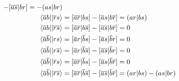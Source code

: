 \begin{align}
	-
	\chemtwo{\borb{a}\borb{s}}{\aorb{b}\aorb{r}}
=
	-\spacetwo{as}{br} \\
%
%
	\antitwo{\borb{a}\aorb{b}}{\borb{r}\aorb{s}}
&=
	\chemtwo{\borb{a}\borb{r}}{\aorb{b}\aorb{s}}
	-
	\chemtwo{\borb{a}\aorb{s}}{\aorb{b}\borb{r}}
=
	\spacetwo{ar}{bs} \\
%
%
	\antitwo{\borb{a}\aorb{b}}{\borb{r}\borb{s}}
&=
	\chemtwo{\borb{a}\borb{r}}{\aorb{b}\borb{s}}
	-
	\chemtwo{\borb{a}\borb{s}}{\aorb{b}\borb{r}}
=
	0 \\
%
%
	\antitwo{\borb{a}\borb{b}}{\aorb{r}\aorb{s}}
&=
	\chemtwo{\borb{a}\aorb{r}}{\borb{b}\aorb{s}}
	-
	\chemtwo{\borb{a}\aorb{s}}{\borb{b}\aorb{r}}
=
	0 \\
%
%
	\antitwo{\borb{a}\borb{b}}{\aorb{r}\borb{s}}
&=
	\chemtwo{\borb{a}\aorb{r}}{\borb{b}\borb{s}}
	-
	\chemtwo{\borb{a}\borb{s}}{\borb{b}\aorb{r}}
=
	0 \\
%
%
	\antitwo{\borb{a}\borb{b}}{\borb{r}\aorb{s}}
&=
	\chemtwo{\borb{a}\borb{r}}{\borb{b}\aorb{s}}
	-
	\chemtwo{\borb{a}\aorb{s}}{\borb{b}\borb{r}}
=
	0 \\
%
%
	\antitwo{\borb{a}\borb{b}}{\borb{r}\borb{s}}
&=
	\chemtwo{\borb{a}\borb{r}}{\borb{b}\borb{s}}
	-
	\chemtwo{\borb{a}\borb{s}}{\borb{b}\borb{r}}
=
	\spacetwo{ar}{bs}
	-
	\spacetwo{as}{br}
\end{align}


